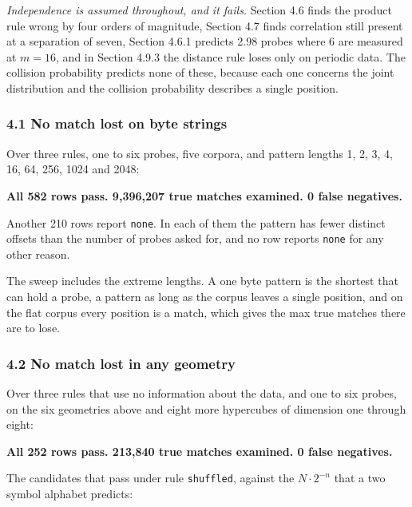 \noindent\emph{Independence is assumed throughout, and it fails.} Section 4.6 finds the product rule wrong by four orders of magnitude, Section 4.7 finds correlation still present at a separation of seven, Section 4.6.1 predicts 2.98 probes where 6 are measured at \(m = 16\), and in Section 4.9.3 the distance rule loses only on periodic data. The collision probability predicts none of these, because each one concerns the joint distribution and the collision probability describes a single position.

\subsubsection{4.1 No match lost on byte strings}

Over three rules, one to six probes, five corpora, and pattern lengths 1, 2, 3, 4, 16, 64, 256, 1024 and 2048:

\noindent\textbf{All 582 rows pass. 9,396,207 true matches examined. 0 false negatives.}

Another 210 rows report \texttt{none}. In each of them the pattern has fewer distinct offsets than the number of probes asked for, and no row reports \texttt{none} for any other reason.

The sweep includes the extreme lengths. A one byte pattern is the shortest that can hold a probe, a pattern as long as the corpus leaves a single position, and on the flat corpus every position is a match, which gives the max true matches there are to lose.

\subsubsection{4.2 No match lost in any geometry}

Over three rules that use no information about the data, and one to six probes, on the six geometries above and eight more hypercubes of dimension one through eight:

\noindent\textbf{All 252 rows pass. 213,840 true matches examined. 0 false negatives.}

The candidates that pass under rule \texttt{shuffled}, against the \(N \cdot 2^{-n}\) that a two symbol alphabet predicts:


